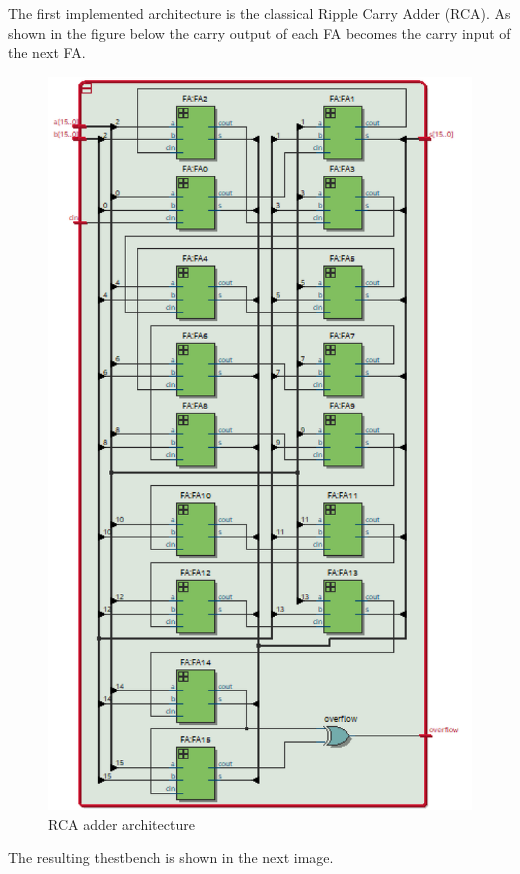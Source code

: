 \documentclass[12pt]{article}
\begin{document}
The first implemented architecture is the classical Ripple Carry Adder (RCA).
As shown in the figure below the carry output of each FA becomes the carry input of the next FA. 
 \begin{figure}[!h]
 	\centering
 	\includegraphics[scale = 0.6]{immagini/niki/rtl2_a.png}
 	\caption{RCA adder architecture}       
 \end{figure}

The resulting thestbench is shown in the next image.
\end{document}
